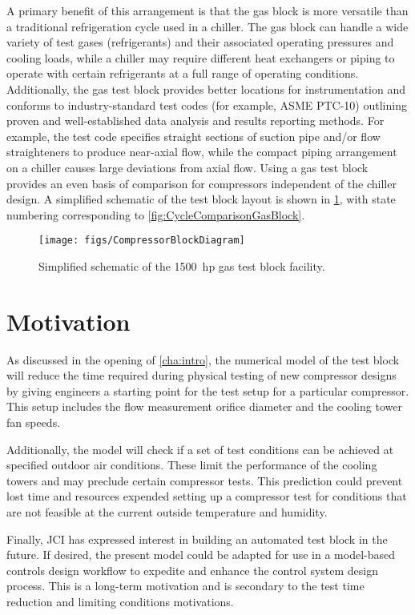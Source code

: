 A primary benefit of this arrangement is that the gas block is 
more versatile than a traditional refrigeration cycle used in a chiller. 
The gas block can handle a wide variety of test gases (refrigerants) 
and their associated operating pressures and cooling loads, 
while a chiller may require different heat exchangers or piping 
to operate with certain refrigerants at a full range of operating conditions.
Additionally, the gas test block provides better locations for instrumentation 
and conforms to industry-standard test codes (for example, ASME%
PTC-10) 
outlining proven and well-established data analysis and results reporting methods. 
For example, the test code specifies straight sections of suction pipe and/or flow straighteners 
to produce near-axial flow, while the compact piping arrangement on a chiller causes large deviations from axial flow. 
Using a gas test block provides an even basis of comparison for compressors independent of the chiller design. 
A simplified schematic of the test block layout is shown in \cref{fig:SimpSchematic}, 
with state numbering corresponding to \cref{fig:CycleComparisonGasBlock}. 
\begin{figure}[htbp]
	\centering
	\texttt{[image: figs/CompressorBlockDiagram]}
	\caption{Simplified schematic of the \SI{1500}{hp} gas test block facility.}
	\label{fig:SimpSchematic}
\end{figure}

\section{Motivation} \label{sec:motivation}
As discussed in the opening of \cref{cha:intro}, 
the numerical model of the test block will reduce the time required during physical testing of new compressor designs 
by giving engineers a starting point for the test setup for a particular compressor. 
This setup includes the flow measurement orifice diameter and the cooling tower fan speeds.

Additionally, the model will check if a set of test conditions 
can be achieved at specified outdoor air conditions. 
These limit the performance of the cooling towers and may preclude certain compressor tests. 
This prediction could prevent lost time and resources expended setting up a compressor test 
for conditions that are not feasible at the current outside temperature and humidity.

Finally, JCI has expressed interest in building an automated test block in the future. 
If desired, the present model could be adapted for use in a model-based controls design workflow 
to expedite and enhance the control system design process. 
This is a long-term motivation and is secondary to the test time reduction and limiting conditions motivations.

